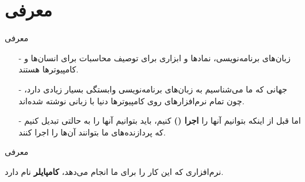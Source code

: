 \section{معرفی}
\begin{frame}{معرفی}
\begin{itemize}\itemr
\item[-]
زبان‌های برنامه‌نویسی، نمادها و ابزاری برای توصیف محاسبات برای انسان‌ها و کامپیوتر‌ها هستند.
\item[-]
جهانی که ما می‌شناسیم به زبان‌های برنامه‌نویسی وابستگی بسیار زیادی دارد، چون تمام نرم‌افزارهای روی کامپیوتر‌ها دنیا با زبانی نوشته شده‌اند.

\item[-]
اما قبل از اینکه بتوانیم آنها را \textbf{اجرا ()} کنیم، باید بتوانیم آنها را به حالتی تبدیل کنیم که پردازنده‌های ما بتوانند آ‌ن‌ها را اجرا کنند.
\end{itemize}
\end{frame}

\begin{frame}{معرفی}
\begin{center}
{\Large نرم‌افزاری که این کار را برای ما انجام می‌دهد، \textbf{کامپایلر} نام دارد.}
\end{center}
\end{frame}